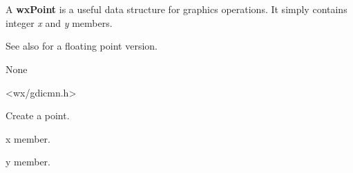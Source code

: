 \section{}\label{wxpoint}

A {\bf wxPoint} is a useful data structure for graphics operations.
It simply contains integer {\it x} and {\it y} members.

See also  for a floating point version.


None


<wx/gdicmn.h>




\label{wxpointctor}



Create a point.

\label{wxpointx}


x member.

\label{wxpointy}


y member.

